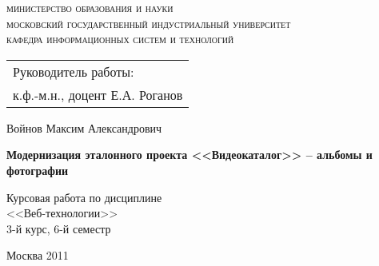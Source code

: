 \thispagestyle{empty}

\vspace*{-\headheight}\vspace*{-\headsep}

{\centering\textsc{ 
министерство образования и науки\\
московский государственный индустриальный университет\\
кафедра информационных систем и технологий\\
}

\vspace{4cm plus 1mm minus 1mm}

\begin{flushright}
\begin{tabular}{l}
Руководитель работы:\\
к.ф.-м.н., доцент Е.А. Роганов
\end{tabular}
\end{flushright}

\vspace{3cm plus 1mm minus 1mm}

Войнов Максим Александрович

\vspace{1cm plus 1mm minus 1mm}
{\large\textbf{
Модернизация эталонного проекта <<Видеокаталог>> -- альбомы и фотографии
}}

\vspace{1cm plus 1mm minus 1mm}

Курсовая работа по дисциплине\\
<<Веб-технологии>>\\
3-й курс, 6-й семестр

\vfill

Москва 2011

}

\newpage
\endinput
